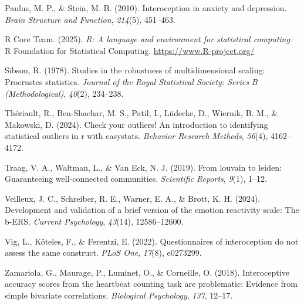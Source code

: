 \documentclass[
  jou,
  floatsintext,
  longtable,
  nolmodern,
  notxfonts,
  notimes,
  colorlinks=true,linkcolor=blue,citecolor=blue,urlcolor=blue]{apa7}
\newlength{\cslhangindent}
\newenvironment{CSLReferences}[2] %
 {\begin{list}{}{%
  \setlength{\itemindent}{0pt}
  \setlength{\leftmargin}{0pt}
  \setlength{\parsep}{0pt}
  \ifodd #1
   \setlength{\leftmargin}{\cslhangindent}
   \setlength{\itemindent}{-1\cslhangindent}
  \fi
  \setlength{\itemsep}{#2\baselineskip}}}
 {\end{list}}
\begin{document}
\begin{CSLReferences}{1}{0}
Paulus, M. P., \& Stein, M. B. (2010). Interoception in anxiety and
depression. \emph{Brain Structure and Function}, \emph{214}(5),
451--463.

R Core Team. (2025). \emph{R: A language and environment for statistical
computing}. R Foundation for Statistical Computing.
\url{https://www.R-project.org/}

Sibson, R. (1978). Studies in the robustness of multidimensional
scaling: Procrustes statistics. \emph{Journal of the Royal Statistical
Society: Series B (Methodological)}, \emph{40}(2), 234--238.

Thériault, R., Ben-Shachar, M. S., Patil, I., Lüdecke, D., Wiernik, B.
M., \& Makowski, D. (2024). Check your outliers! An introduction to
identifying statistical outliers in r with easystats. \emph{Behavior
Research Methods}, \emph{56}(4), 4162--4172.

Traag, V. A., Waltman, L., \& Van Eck, N. J. (2019). From louvain to
leiden: Guaranteeing well-connected communities. \emph{Scientific
Reports}, \emph{9}(1), 1--12.

Veilleux, J. C., Schreiber, R. E., Warner, E. A., \& Brott, K. H.
(2024). Development and validation of a brief version of the emotion
reactivity scale: The b-ERS. \emph{Current Psychology}, \emph{43}(14),
12586--12600.

Vig, L., Köteles, F., \& Ferentzi, E. (2022). Questionnaires of
interoception do not assess the same construct. \emph{PLoS One},
\emph{17}(8), e0273299.

Zamariola, G., Maurage, P., Luminet, O., \& Corneille, O. (2018).
Interoceptive accuracy scores from the heartbeat counting task are
problematic: Evidence from simple bivariate correlations.
\emph{Biological Psychology}, \emph{137}, 12--17.

\end{CSLReferences}
\end{document}
